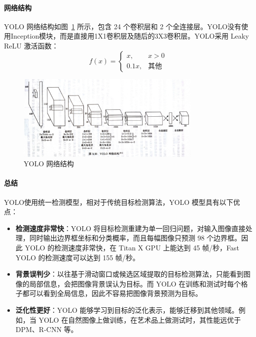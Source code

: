 \documentclass[12pt, a4paper]{article}
\begin{document}
\paragraph{网络结构}
YOLO 网络结构如图~\ref{fig:yolo_arch} 所示，包含 24 个卷积层和 2 个全连接层。YOLO没有使用Inception模块，而是直接用1X1卷积层及随后的3X3卷积层。YOLO采用 Leaky ReLU 激活函数：
\begin{equation}
f(x) = 
\begin{cases} 
x, & x > 0 \\
0.1x, & \text{其他}
\end{cases}
\end{equation}

\begin{figure}[htbp]
    \centering
    \includegraphics[width=0.8\textwidth]{image/yolowangluojiegou.jpg} %
    \caption{YOLO 网络结构}
    \label{fig:yolo_arch}
\end{figure}

\paragraph{总结}
YOLO使用统一检测模型，相对于传统目标检测算法，YOLO 模型具有以下优点：
\begin{itemize}
    \item \textbf{检测速度非常快}：YOLO 将目标检测重建为单一回归问题，对输入图像直接处理，同时输出边界框坐标和分类概率，而且每幅图像只预测 98 个边界框。因此 YOLO 的检测速度非常快，在 Titan X GPU 上能达到 45 帧/秒，Fast YOLO 的检测速度可以达到 155 帧/秒。
    
    \item \textbf{背景误判少}：以往基于滑动窗口或候选区域提取的目标检测算法，只能看到图像的局部信息，会把图像背景误认为目标。而 YOLO 在训练和测试时每个格子都可以看到全局信息，因此不容易把图像背景预测为目标。
    
    \item \textbf{泛化性更好}：YOLO 能够学习到目标的泛化表示，能够迁移到其他领域。例如，当 YOLO 在自然图像上做训练，在艺术品上做测试时，其性能远优于 DPM、R-CNN 等。
\end{itemize}
\end{document}
